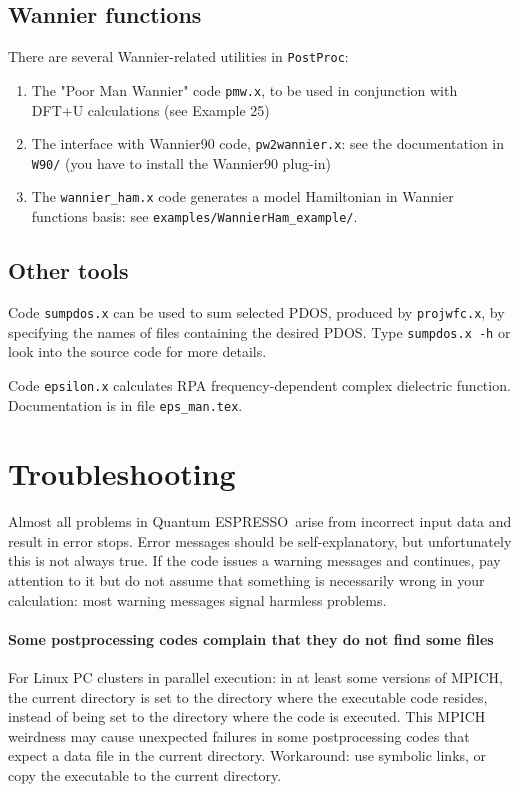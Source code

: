 \documentclass[12pt,a4paper]{article}
\def\qe{{\sc Quantum ESPRESSO}}
\def\PostProc{\texttt{PostProc}}
\begin{document}
\subsection{Wannier functions}

There are several Wannier-related utilities in \PostProc:
\begin{enumerate}
\item The "Poor Man Wannier" code \texttt{pmw.x}, to be used
in conjunction with DFT+U calculations (see Example 25)
\item The interface with Wannier90 code, \texttt{pw2wannier.x}:
see the documentation in \texttt{W90/} (you have to install the 
Wannier90 plug-in)
\item The \texttt{wannier\_ham.x} code generates a model Hamiltonian 
in Wannier functions basis: see \texttt{examples/WannierHam\_example/}.
\end{enumerate}

\subsection{Other tools}

Code \texttt{sumpdos.x} can be used to sum selected PDOS, produced by
\texttt{projwfc.x}, by specifying the names of files
containing the desired PDOS. Type \texttt{sumpdos.x -h} or look into the source
code for more details. 

Code \texttt{epsilon.x} calculates RPA frequency-dependent complex dielectric 
function. Documentation is in file \texttt{eps\_man.tex}.

\section{Troubleshooting}

Almost all problems in \qe\ arise from incorrect input data 
and result in
error stops. Error messages should be self-explanatory, but unfortunately
this is not always true. If the code issues a warning messages and continues,
pay attention to it but do not assume that something is necessarily wrong in
your calculation: most warning messages signal harmless problems.

\paragraph{Some postprocessing codes complain that they do not find some files}
For Linux PC clusters in parallel execution: in at least some versions
of MPICH, the current directory is set to the directory where the executable
code resides, instead of being set to the directory where the code is executed.
This MPICH weirdness may cause unexpected failures in some postprocessing
codes that expect a data file in the current directory. Workaround: use
symbolic links, or copy the executable to the current directory.
\end{document}
